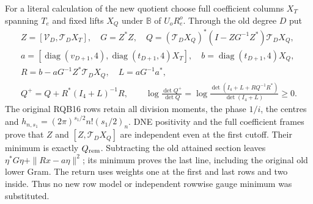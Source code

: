 \documentclass[11pt,a4paper]{article}
\begin{document}
For a literal calculation of the new quotient choose full
coefficient columns $X_T$ spanning $T_e$ and fixed lifts $X_Q$
under $\mathbb B$ of $U_oR_e^o$. Through the old degree $D$ put
\[
 \begin{gathered}
 Z=[\mathcal V_D,\mathcal T_DX_T],\quad G=Z^*Z,\quad
 Q=(\mathcal T_DX_Q)^*(I-ZG^{-1}Z^*)\mathcal T_DX_Q,\\
 a=[\operatorname{diag}(v_{D+1},4),
             \operatorname{diag}(t_{D+1},4)X_T],\quad
 b=\operatorname{diag}(t_{D+1},4)X_Q,\\
 R=b-aG^{-1}Z^*\mathcal T_DX_Q,\quad L=aG^{-1}a^*,\\
 Q^+=Q+R^*(I_4+L)^{-1}R,\qquad
 \log\frac{\det Q^+}{\det Q}
   =\log\frac{\det(I_4+L+RQ^{-1}R^*)}{\det(I_4+L)}\ge0 .
 \end{gathered}\tag{RQB39}
\]
The original RQB16 rows retain all division moments, the phase
$1/i$, the centres and $h_{n,s_1}=(2\pi)^{s_1/2}n!(s_1/2)_n$.
DNE positivity and the full coefficient frames prove that $Z$
and $[Z,\mathcal T_DX_Q]$ are independent even at the first
cutoff. Their minimum is exactly $Q_{\rm rem}$.
Subtracting the old attained section leaves
$\eta^*G\eta+\|Rx-a\eta\|^2$; its minimum proves the last line,
including the original old lower Gram. The return uses weights
one at the first and last rows and two inside. Thus no new
row model or independent rowwise gauge minimum was substituted.



\endgroup


\clearpage
\clearpage
\begingroup
\providecommand{\im}{\operatorname{im}}
\providecommand{\rank}{\operatorname{rank}}
\end{document}
